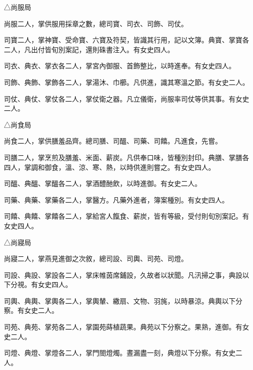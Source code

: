 \begin{pinyinscope}
 △尚服局



 尚服二人，掌供服用採章之數，總司寶、司衣、司飾、司仗。



 司寶二人，掌神寶、受命寶、六寶及符契，皆識其行用，記以文簿。典寶、掌寶各二人，凡出付皆旬別案記，還則硃書注入。有女史四人。



 司衣、典衣、掌衣各二人，掌宮內御服、首飾整比，以時進奉。有女史四人。



 司飾、典飾、掌飾各二人，掌湯沐、巾櫛。凡供進，識其寒溫之節。有女史二人。



 司仗、典仗、掌仗各二人，掌仗衛之器。凡立儀衛，尚服率司仗等供其事。有女史二人。



 △尚食局



 尚食二人，掌供膳羞品齊。總司膳、司醞、司藥、司饎。凡進食，先嘗。



 司膳二人，掌烹煎及膳羞、米面、薪炭。凡供奉口味，皆種別封印。典膳、掌膳各四人，掌調和御食，溫、涼、寒、熱，以時供進則嘗之。有女史四人。



 司醞、典醞、掌醞各二人，掌酒醴酏飲，以時進御。有女史二人。



 司藥、典藥、掌藥各二人，掌醫方。凡藥外進者，簿案種別。有女史四人。



 司饎、典饎、掌饎各二人，掌給宮人餼食、薪炭，皆有等級，受付則旬別案記。有女史四人。



 △尚寢局



 尚寢二人，掌燕見進御之次敘，總司設、司輿、司苑、司燈。



 司設、典設、掌設各二人，掌床帷茵席鋪設，久故者以狀聞。凡汛掃之事，典設以下分視。有女史四人。



 司輿、典輿、掌輿各二人，掌輿輦、繖扇、文物、羽旄，以時暴涼。典輿以下分察。有女史二人。



 司苑、典苑、掌苑各二人，掌園苑蒔植蔬果。典苑以下分察之。果熟，進御。有女史二人。



 司燈、典燈、掌燈各二人，掌門閤燈燭。晝漏盡一刻，典燈以下分察。有女史二人。




\end{pinyinscope}

